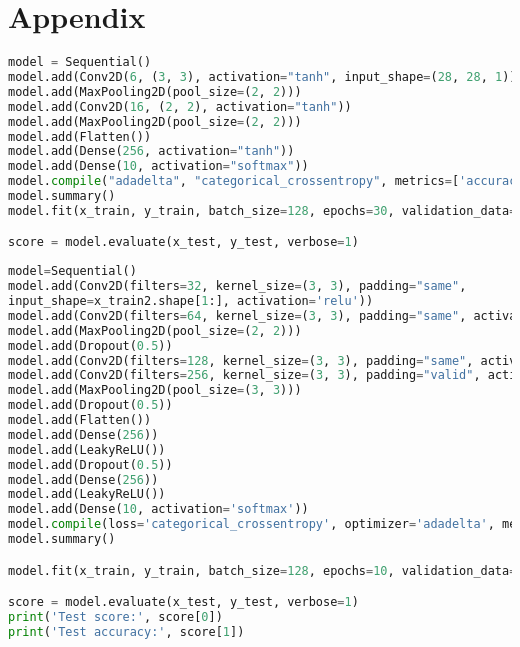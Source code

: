 \chapter{Appendix}
\begin{lstlisting}[language=Python,label={code:lenet},caption={LeNet code}]
model = Sequential()
model.add(Conv2D(6, (3, 3), activation="tanh", input_shape=(28, 28, 1)))
model.add(MaxPooling2D(pool_size=(2, 2)))
model.add(Conv2D(16, (2, 2), activation="tanh"))
model.add(MaxPooling2D(pool_size=(2, 2)))
model.add(Flatten())
model.add(Dense(256, activation="tanh"))
model.add(Dense(10, activation="softmax"))
model.compile("adadelta", "categorical_crossentropy", metrics=['accuracy'])
model.summary()
model.fit(x_train, y_train, batch_size=128, epochs=30, validation_data=(x_test, y_test))

score = model.evaluate(x_test, y_test, verbose=1)
\end{lstlisting}

\begin{lstlisting}[language=Python,label={code:vggnet},caption={VGG-like Net Code}]
model=Sequential()
model.add(Conv2D(filters=32, kernel_size=(3, 3), padding="same", 
input_shape=x_train2.shape[1:], activation='relu'))
model.add(Conv2D(filters=64, kernel_size=(3, 3), padding="same", activation='relu'))
model.add(MaxPooling2D(pool_size=(2, 2)))
model.add(Dropout(0.5))
model.add(Conv2D(filters=128, kernel_size=(3, 3), padding="same", activation='relu'))
model.add(Conv2D(filters=256, kernel_size=(3, 3), padding="valid", activation='relu'))
model.add(MaxPooling2D(pool_size=(3, 3)))
model.add(Dropout(0.5))
model.add(Flatten())
model.add(Dense(256))
model.add(LeakyReLU())
model.add(Dropout(0.5))
model.add(Dense(256))
model.add(LeakyReLU())
model.add(Dense(10, activation='softmax'))
model.compile(loss='categorical_crossentropy', optimizer='adadelta', metrics=['accuracy'])
model.summary()

model.fit(x_train, y_train, batch_size=128, epochs=10, validation_data=(x_test, y_test))

score = model.evaluate(x_test, y_test, verbose=1)
print('Test score:', score[0])
print('Test accuracy:', score[1])
\end{lstlisting}

